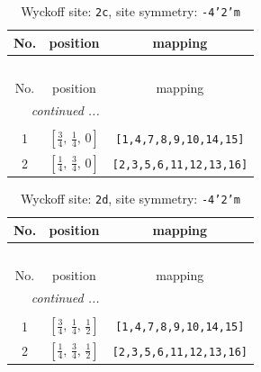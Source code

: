 \documentclass[fleqn,8pt]{jsarticle}
\begin{document}
\renewcommand{\arraystretch}{1.2}
\begin{longtable}{ccc}
\caption{Wyckoff site: {\tt 2c}, site symmetry: {\tt -4'2'm}}
 \\
 \hline \hline
No. & position & mapping \\ \hline \endfirsthead

\multicolumn{2}{l}{\tablename\ \thetable{}} \\
 \hline \hline
No. & position & mapping \\ \hline \endhead

 \hline \hline
\multicolumn{2}{r}{\footnotesize\it continued ...} \\ \endfoot

 \hline \hline
\multicolumn{2}{r}{} \\ \endlastfoot

1 & $\left[ \frac{3}{4},\, \frac{1}{4},\, 0 \right]$ & {\tt [1,4,7,8,9,10,14,15]} \\ \hline
2 & $\left[ \frac{1}{4},\, \frac{3}{4},\, 0 \right]$ & {\tt [2,3,5,6,11,12,13,16]} \\
\end{longtable}
\renewcommand{\arraystretch}{1.2}
\begin{longtable}{ccc}
\caption{Wyckoff site: {\tt 2d}, site symmetry: {\tt -4'2'm}}
 \\
 \hline \hline
No. & position & mapping \\ \hline \endfirsthead

\multicolumn{2}{l}{\tablename\ \thetable{}} \\
 \hline \hline
No. & position & mapping \\ \hline \endhead

 \hline \hline
\multicolumn{2}{r}{\footnotesize\it continued ...} \\ \endfoot

 \hline \hline
\multicolumn{2}{r}{} \\ \endlastfoot

1 & $\left[ \frac{3}{4},\, \frac{1}{4},\, \frac{1}{2} \right]$ & {\tt [1,4,7,8,9,10,14,15]} \\ \hline
2 & $\left[ \frac{1}{4},\, \frac{3}{4},\, \frac{1}{2} \right]$ & {\tt [2,3,5,6,11,12,13,16]} \\
\end{longtable}
\renewcommand{\arraystretch}{1.2}
\end{document}
